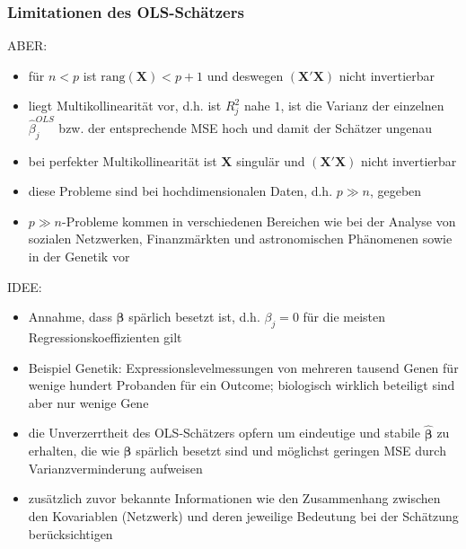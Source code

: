 \documentclass{beamer}
\begin{document}
\begin{frame} %
  \frametitle{Limitationen des OLS-Schätzers} 
  ABER: 
    \begin{itemize}
    \item für $n < p$ ist $\text{rang}(\mathbf{X}
    )<p+1$ und deswegen $\left(\mathbf{X}'\mathbf{X}\right)$ nicht invertierbar
    \item liegt Multikollinearität vor, d.h. ist $R^2_j$ nahe $1$, ist die Varianz der einzelnen $\hat{\beta}_j^{OLS}$ bzw. der entsprechende MSE hoch und damit der Schätzer ungenau
    \item bei perfekter Multikollinearität ist $\mathbf{X}$ singulär und $\left(\mathbf{X}'\mathbf{X}\right)$ nicht invertierbar
    \end{itemize}
    \begin{itemize}
    \item diese Probleme sind bei hochdimensionalen Daten, d.h. $p \gg n$, gegeben
    \item $p \gg n$-Probleme kommen in verschiedenen Bereichen wie bei der Analyse von sozialen Netzwerken, Finanzmärkten und astronomischen Phänomenen sowie in der Genetik vor
    \end{itemize}
    
\end{frame}

\begin{frame}
	IDEE:
	\begin{itemize}
	\item Annahme, dass $\boldsymbol{\beta}$ spärlich besetzt ist, d.h. $\beta_j=0$ für die meisten Regressionskoeffizienten gilt
	\item Beispiel Genetik: Expressionslevelmessungen von mehreren tausend Genen für wenige hundert Probanden für ein Outcome; biologisch wirklich beteiligt sind aber nur wenige Gene
	\item die Unverzerrtheit des OLS-Schätzers {\glqq}opfern{\grqq} um eindeutige und stabile $\boldsymbol{\hat{\beta}}$ zu erhalten, die wie $\boldsymbol{\beta}$ spärlich besetzt sind und möglichst geringen MSE durch Varianzverminderung aufweisen
	\item zusätzlich zuvor bekannte Informationen wie den Zusammenhang zwischen den Kovariablen (Netzwerk) und deren jeweilige Bedeutung bei der Schätzung berücksichtigen
	\end{itemize}
\end{frame}
\end{document}
